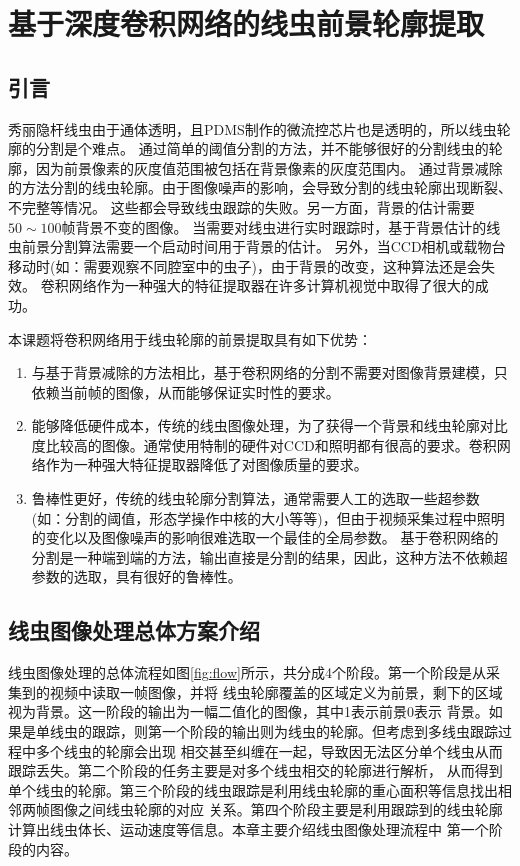 \chapter{基于深度卷积网络的线虫前景轮廓提取}
\section{引言}
秀丽隐杆线虫由于通体透明，且PDMS制作的微流控芯片也是透明的，所以线虫轮廓的分割是个难点。
通过简单的阈值分割的方法，并不能够很好的分割线虫的轮廓，因为前景像素的灰度值范围被包括在背景像素的灰度范围内。
通过背景减除的方法分割的线虫轮廓。由于图像噪声的影响，会导致分割的线虫轮廓出现断裂、不完整等情况。
这些都会导致线虫跟踪的失败。另一方面，背景的估计需要$50\sim100$帧背景不变的图像。
当需要对线虫进行实时跟踪时，基于背景估计的线虫前景分割算法需要一个启动时间用于背景的估计。
另外，当CCD相机或载物台移动时(如：需要观察不同腔室中的虫子)，由于背景的改变，这种算法还是会失效。
卷积网络作为一种强大的特征提取器在许多计算机视觉中取得了很大的成功。

	本课题将卷积网络用于线虫轮廓的前景提取具有如下优势：
	
\begin{enumerate}
  \item 与基于背景减除的方法相比，基于卷积网络的分割不需要对图像背景建模，只依赖当前帧的图像，从而能够保证实时性的要求。
  \item 能够降低硬件成本，传统的线虫图像处理，为了获得一个背景和线虫轮廓对比度比较高的图像。通常使用特制的硬件对CCD和照明都有很高的要求。卷积网络作为一种强大特征提取器降低了对图像质量的要求。
  \item 鲁棒性更好，传统的线虫轮廓分割算法，通常需要人工的选取一些超参数(如：分割的阈值，形态学操作中核的大小等等)，但由于视频采集过程中照明的变化以及图像噪声的影响很难选取一个最佳的全局参数。
基于卷积网络的分割是一种端到端的方法，输出直接是分割的结果，因此，这种方法不依赖超参数的选取，具有很好的鲁棒性。
\end{enumerate}
\section{线虫图像处理总体方案介绍}
	线虫图像处理的总体流程如图\ref{fig:flow}所示，共分成4个阶段。第一个阶段是从采集到的视频中读取一帧图像，并将
	线虫轮廓覆盖的区域定义为前景，剩下的区域视为背景。这一阶段的输出为一幅二值化的图像，其中1表示前景0表示
	背景。如果是单线虫的跟踪，则第一个阶段的输出则为线虫的轮廓。但考虑到多线虫跟踪过程中多个线虫的轮廓会出现
	相交甚至纠缠在一起，导致因无法区分单个线虫从而跟踪丢失。第二个阶段的任务主要是对多个线虫相交的轮廓进行解析，
	从而得到单个线虫的轮廓。第三个阶段的线虫跟踪是利用线虫轮廓的重心面积等信息找出相邻两帧图像之间线虫轮廓的对应
	关系。第四个阶段主要是利用跟踪到的线虫轮廓计算出线虫体长、运动速度等信息。本章主要介绍线虫图像处理流程中
	第一个阶段的内容。

